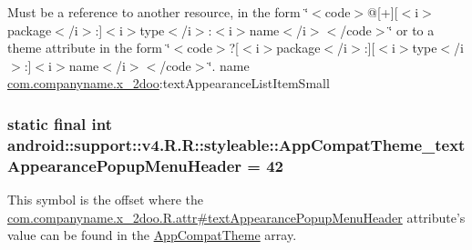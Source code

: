 Must be a reference to another resource, in the form \char`\"{}$<$code$>$@\mbox{[}+\mbox{]}\mbox{[}$<$i$>$package$<$/i$>$:\mbox{]}$<$i$>$type$<$/i$>$:$<$i$>$name$<$/i$>$$<$/code$>$\char`\"{} or to a theme attribute in the form \char`\"{}$<$code$>$?\mbox{[}$<$i$>$package$<$/i$>$:\mbox{]}\mbox{[}$<$i$>$type$<$/i$>$:\mbox{]}$<$i$>$name$<$/i$>$$<$/code$>$\char`\"{}.  name \hyperlink{namespacecom_1_1companyname_1_1x__2doo}{com.companyname.x\_\-2doo}:textAppearanceListItemSmall \hypertarget{classandroid_1_1support_1_1v4_1_1_r_1_1styleable_3eaecb6b4885a61e22337bd4cace8963}{
\subsubsection[{AppCompatTheme\_\-textAppearancePopupMenuHeader}]{\setlength{\rightskip}{0pt plus 5cm}static final int android::support::v4.R.R::styleable::AppCompatTheme\_\-textAppearancePopupMenuHeader = 42}}
\label{classandroid_1_1support_1_1v4_1_1_r_1_1styleable_3eaecb6b4885a61e22337bd4cace8963}


This symbol is the offset where the \hyperlink{classcom_1_1companyname_1_1x__2doo_1_1_r_1_1attr_669258be6387f0b17dab897e56b622bb}{com.companyname.x\_\-2doo.R.attr\#textAppearancePopupMenuHeader} attribute's value can be found in the \hyperlink{classandroid_1_1support_1_1v4_1_1_r_1_1styleable_0873e92ba21076bb5a4aeadeb7f5779f}{AppCompatTheme} array.


